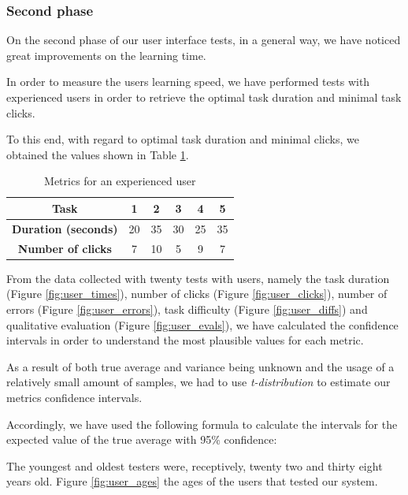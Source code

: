   \subsubsection {Second phase}

On the second phase of our user interface tests, in a general way, we have noticed great improvements on the learning time.

In order to measure the users learning speed, we have performed tests with experienced users in order to retrieve the optimal task duration and minimal task clicks.

To this end, with regard to optimal task duration and minimal clicks, we obtained the values shown in Table \ref{table:optimal}.


\begin{table}[H]
\centering
\caption{Metrics for an experienced user}
\label{table:optimal}
\begin{tabular}{|c|c|c|c|c|c|}
\hline
\textbf{Task} & 1 & 2 & 3 & 4 & 5 \\ \hline
\textbf{Duration (seconds)} & 20 & 35 & 30 & 25 & 35 \\ \hline
\textbf{Number of clicks} & 7 & 10 & 5 & 9 & 7 \\ \hline
\end{tabular}
\end{table}


From the data collected with twenty tests with users, namely the task duration (Figure \ref{fig:user_times}), number of clicks (Figure \ref{fig:user_clicks}), number of errors (Figure \ref{fig:user_errors}), task difficulty (Figure \ref{fig:user_diffs}) and qualitative evaluation (Figure \ref{fig:user_evals}), we have calculated the confidence intervals in order to understand the most plausible values for each metric.

As a result of both true average and variance being unknown and the usage of a relatively small amount of samples, we had to use \emph{t-distribution} to estimate our metrics confidence intervals. 

Accordingly, we have used the following formula to calculate the intervals for the expected value of the true average with 95\% confidence:
\begin{equation}
[\bar{x}-F^{-1}_{t_{(n-1)}}(1-\alpha/2)\times \frac{s}{\sqrt{n}}, \bar{x}+F^{-1}_{t_{(n-1)}}(1-\alpha/2)\times \frac{s}{\sqrt{n}}]
\end{equation}

The youngest and oldest testers were, receptively, twenty two and thirty eight years old. Figure \ref{fig:user_ages} the ages of the users that tested our system.

